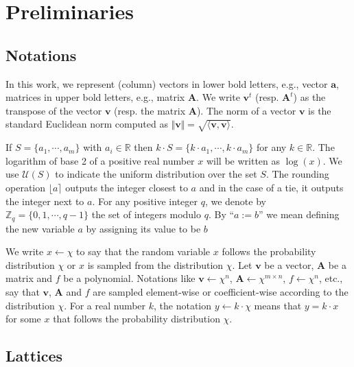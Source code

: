 \documentclass{cta-author}
\begin{document}
\section{Preliminaries} \label{pre}



\subsection{Notations} In this work, we represent (column) vectors in lower bold letters, e.g., vector $\mathbf{a}$, matrices in upper bold letters, e.g., matrix $\mathbf{A}$. We write $\mathbf{v}^t$ (resp. $\mathbf{A}^t$) as the transpose of the vector $\mathbf{v}$ (resp. the matrix $\mathbf{A}$). The norm of a vector $\mathbf{v}$ is the standard Euclidean norm  computed as $\Vert \mathbf{v}\Vert=\sqrt{\langle \mathbf{v}, \mathbf{v}\rangle}$. 



If $S=\{a_1, \cdots ,a_m\}$ with $a_i\in \mathbb{R}$ then $k\cdot S=\{k\cdot  a_1,\cdots,k\cdot  a_m\}$ for any $k\in \mathbb{R}$. The logarithm of base 2 of a positive real number $x$ will be written as $\log (x)$. We use $\mathcal{U}(S)$ to indicate the uniform distribution over the set $S$. The rounding operation $\lfloor a \rceil$ outputs the integer closest to $a$ and in the case of a tie, it outputs the integer next to $a$. For any positive integer $q$, we denote by $\mathbb{Z}_q=\{0,1, \cdots, q-1\}$ the set of integers modulo $q$. By ``$a:=b$'' we mean defining the new variable $a$ by assigning its value to be $b$ 

We write $x \leftarrow \chi$ to say that the random variable $x$ follows the probability distribution $\chi$ or $x$ is sampled from the distribution $\chi$. Let $\mathbf{v}$ be a vector, $\mathbf{A}$ be a matrix and $f$ be a polynomial. Notations like $\mathbf{v} \leftarrow \chi^n$, $\mathbf{A} \leftarrow \chi^{m \times n}$, $f \leftarrow \chi^n$, etc., say that $\mathbf{v}$, $\mathbf{A}$ and $f$  are sampled element-wise or coefficient-wise according to the distribution $\chi$. For a real number $k$, the notation $y \leftarrow k \cdot \chi$ means that $y=k \cdot x$ for some $x$ that follows the probability distribution $\chi$. 

\subsection{Lattices}
\end{document}
